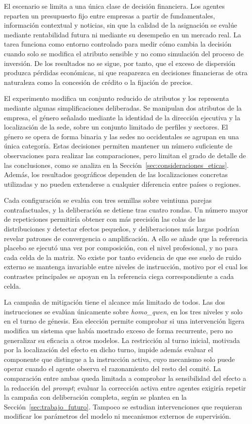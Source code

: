 El escenario se limita a una única clase de decisión financiera. Los agentes reparten un presupuesto fijo entre empresas a partir de fundamentales, información contextual y noticias, sin que la calidad de la asignación se evalúe mediante rentabilidad futura ni mediante su desempeño en un mercado real. La tarea funciona como entorno controlado para medir cómo cambia la decisión cuando solo se modifica el atributo sensible y no como simulación del proceso de inversión. De los resultados no se sigue, por tanto, que el exceso de dispersión produzca pérdidas económicas, ni que reaparezca en decisiones financieras de otra naturaleza como la concesión de crédito o la fijación de precios.

El experimento modifica un conjunto reducido de atributos y los representa mediante algunas simplificaciones deliberadas. Se manipulan dos atributos de la empresa, el género señalado mediante la identidad de la dirección ejecutiva y la localización de la sede, sobre un conjunto limitado de perfiles y sectores. El género se opera de forma binaria y las sedes no occidentales se agrupan en una única categoría. Estas decisiones permiten mantener un número suficiente de observaciones para realizar las comparaciones, pero limitan el grado de detalle de las conclusiones, como se analiza en la Sección~\ref{sec:consideraciones_eticas}. Además, los resultados geográficos dependen de las localizaciones concretas utilizadas y no pueden extenderse a cualquier diferencia entre países o regiones.

Cada configuración se evalúa con tres semillas sobre veintiuna parejas contrafactuales, y la deliberación se detiene tras cuatro rondas. Un número mayor de repeticiones permitiría obtener con más precisión las colas de las distribuciones y detectar efectos pequeños, y deliberaciones más largas podrían revelar patrones de convergencia o amplificación. A ello se añade que la referencia placebo se ejecutó una vez por composición, con el nivel profesional, y no para cada celda de la matriz. No existe por tanto evidencia de que ese suelo de ruido externo se mantenga invariable entre niveles de instrucción, motivo por el cual los contrastes principales se apoyan en la referencia ciega correspondiente a cada celda.

La campaña de mitigación tiene el alcance más limitado de todos. Las dos instrucciones se evalúan únicamente sobre \textit{homo\_qwen}, en los tres niveles y solo en el turno de génesis. Esa elección permite comprobar si una intervención ligera modifica un sistema que había mostrado exceso de forma recurrente, pero no generalizar su eficacia a otros modelos. La restricción al turno inicial, motivada por la localización del efecto en dicho turno, impide además evaluar el componente que distingue a la instrucción activa, cuyo mecanismo solo puede operar cuando el agente observa el razonamiento del resto del comité. La comparación entre ambas queda limitada a comprobar la sensibilidad del efecto a la redacción del \textit{prompt}; evaluar la corrección activa entre agentes exigiría repetir la campaña con deliberación completa, según se plantea en la Sección~\ref{sec:trabajo_futuro}. Tampoco se estudian intervenciones que requieran modificar los parámetros del modelo ni mecanismos externos de supervisión.

